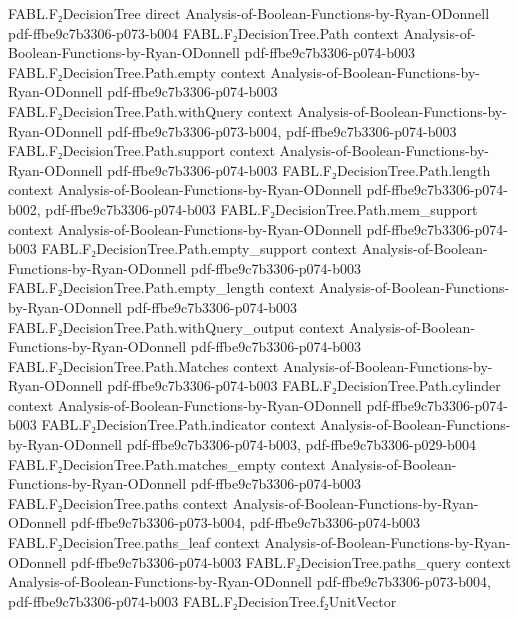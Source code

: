 \begin{theorem}
\proofstep
  {FABL.F₂DecisionTree}
  {direct}
  {Analysis-of-Boolean-Functions-by-Ryan-ODonnell}
  {pdf-ffbe9c7b3306-p073-b004}
\proofstep
  {FABL.F₂DecisionTree.Path}
  {context}
  {Analysis-of-Boolean-Functions-by-Ryan-ODonnell}
  {pdf-ffbe9c7b3306-p074-b003}
\proofstep
  {FABL.F₂DecisionTree.Path.empty}
  {context}
  {Analysis-of-Boolean-Functions-by-Ryan-ODonnell}
  {pdf-ffbe9c7b3306-p074-b003}
\proofstep
  {FABL.F₂DecisionTree.Path.withQuery}
  {context}
  {Analysis-of-Boolean-Functions-by-Ryan-ODonnell}
  {pdf-ffbe9c7b3306-p073-b004,
    pdf-ffbe9c7b3306-p074-b003}
\proofstep
  {FABL.F₂DecisionTree.Path.support}
  {context}
  {Analysis-of-Boolean-Functions-by-Ryan-ODonnell}
  {pdf-ffbe9c7b3306-p074-b003}
\proofstep
  {FABL.F₂DecisionTree.Path.length}
  {context}
  {Analysis-of-Boolean-Functions-by-Ryan-ODonnell}
  {pdf-ffbe9c7b3306-p074-b002,
    pdf-ffbe9c7b3306-p074-b003}
\proofstep
  {FABL.F₂DecisionTree.Path.mem_support}
  {context}
  {Analysis-of-Boolean-Functions-by-Ryan-ODonnell}
  {pdf-ffbe9c7b3306-p074-b003}
\proofstep
  {FABL.F₂DecisionTree.Path.empty_support}
  {context}
  {Analysis-of-Boolean-Functions-by-Ryan-ODonnell}
  {pdf-ffbe9c7b3306-p074-b003}
\proofstep
  {FABL.F₂DecisionTree.Path.empty_length}
  {context}
  {Analysis-of-Boolean-Functions-by-Ryan-ODonnell}
  {pdf-ffbe9c7b3306-p074-b003}
\proofstep
  {FABL.F₂DecisionTree.Path.withQuery_output}
  {context}
  {Analysis-of-Boolean-Functions-by-Ryan-ODonnell}
  {pdf-ffbe9c7b3306-p074-b003}
\proofstep
  {FABL.F₂DecisionTree.Path.Matches}
  {context}
  {Analysis-of-Boolean-Functions-by-Ryan-ODonnell}
  {pdf-ffbe9c7b3306-p074-b003}
\proofstep
  {FABL.F₂DecisionTree.Path.cylinder}
  {context}
  {Analysis-of-Boolean-Functions-by-Ryan-ODonnell}
  {pdf-ffbe9c7b3306-p074-b003}
\proofstep
  {FABL.F₂DecisionTree.Path.indicator}
  {context}
  {Analysis-of-Boolean-Functions-by-Ryan-ODonnell}
  {pdf-ffbe9c7b3306-p074-b003,
    pdf-ffbe9c7b3306-p029-b004}
\proofstep
  {FABL.F₂DecisionTree.Path.matches_empty}
  {context}
  {Analysis-of-Boolean-Functions-by-Ryan-ODonnell}
  {pdf-ffbe9c7b3306-p074-b003}
\proofstep
  {FABL.F₂DecisionTree.paths}
  {context}
  {Analysis-of-Boolean-Functions-by-Ryan-ODonnell}
  {pdf-ffbe9c7b3306-p073-b004,
    pdf-ffbe9c7b3306-p074-b003}
\proofstep
  {FABL.F₂DecisionTree.paths_leaf}
  {context}
  {Analysis-of-Boolean-Functions-by-Ryan-ODonnell}
  {pdf-ffbe9c7b3306-p074-b003}
\proofstep
  {FABL.F₂DecisionTree.paths_query}
  {context}
  {Analysis-of-Boolean-Functions-by-Ryan-ODonnell}
  {pdf-ffbe9c7b3306-p073-b004,
    pdf-ffbe9c7b3306-p074-b003}
\proofstep
  {FABL.F₂DecisionTree.f₂UnitVector}

\end{theorem}
